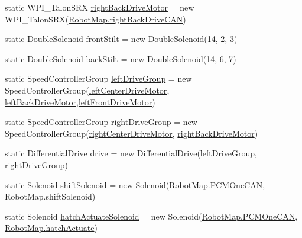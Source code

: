 \begin{DoxyCompactItemize}
\item 
static W\+P\+I\+\_\+\+Talon\+S\+RX \hyperlink{classfrc_1_1robot_1_1OI_a5f2937beffdc7dd1d937aaff36f20c1e}{right\+Back\+Drive\+Motor} = new W\+P\+I\+\_\+\+Talon\+S\+RX(\hyperlink{classfrc_1_1robot_1_1RobotMap_a0fb2fff6bf26e3f196d1cb02a89072c3}{Robot\+Map.\+right\+Back\+Drive\+C\+AN})
\item 
static Double\+Solenoid \hyperlink{classfrc_1_1robot_1_1OI_a4f6b2dd823bad92cfaf2e9ecc7c0b1ca}{front\+Stilt} = new Double\+Solenoid(14, 2, 3)
\item 
static Double\+Solenoid \hyperlink{classfrc_1_1robot_1_1OI_a89667abb08d7721a47088f0218fd5afa}{back\+Stilt} = new Double\+Solenoid(14, 6, 7)
\item 
static Speed\+Controller\+Group \hyperlink{classfrc_1_1robot_1_1OI_a6d76241e542ab271366e4cb4bf7b5133}{left\+Drive\+Group} = new Speed\+Controller\+Group(\hyperlink{classfrc_1_1robot_1_1OI_a8c33a9f0b9e366e48abd23ab01907e18}{left\+Center\+Drive\+Motor}, \hyperlink{classfrc_1_1robot_1_1OI_a88080d092baf8ece2c22f2ceec4f6f8f}{left\+Back\+Drive\+Motor},\hyperlink{classfrc_1_1robot_1_1OI_a3f39e281419ebd60b94126e87e3ec81d}{left\+Front\+Drive\+Motor})
\item 
static Speed\+Controller\+Group \hyperlink{classfrc_1_1robot_1_1OI_a1595c2b8ebd7e4e467027b2eb21983ee}{right\+Drive\+Group} = new Speed\+Controller\+Group(\hyperlink{classfrc_1_1robot_1_1OI_a9be3279c18d1f3433d6b07c706eb1457}{right\+Center\+Drive\+Motor}, \hyperlink{classfrc_1_1robot_1_1OI_a5f2937beffdc7dd1d937aaff36f20c1e}{right\+Back\+Drive\+Motor})
\item 
static Differential\+Drive \hyperlink{classfrc_1_1robot_1_1OI_a8527ec31aa37a3ff523e5ba857aba46f}{drive} = new Differential\+Drive(\hyperlink{classfrc_1_1robot_1_1OI_a6d76241e542ab271366e4cb4bf7b5133}{left\+Drive\+Group}, \hyperlink{classfrc_1_1robot_1_1OI_a1595c2b8ebd7e4e467027b2eb21983ee}{right\+Drive\+Group})
\item 
static Solenoid \hyperlink{classfrc_1_1robot_1_1OI_a63a56e8585378f6afe6f45facc98f494}{shift\+Solenoid} = new Solenoid(\hyperlink{classfrc_1_1robot_1_1RobotMap_a79a848df56d706c787d9a4f9a0434e7f}{Robot\+Map.\+P\+C\+M\+One\+C\+AN}, Robot\+Map.\+shift\+Solenoid)
\item 
static Solenoid \hyperlink{classfrc_1_1robot_1_1OI_a232ad4f80d75cd3d48c2067251c59817}{hatch\+Actuate\+Solenoid} = new Solenoid(\hyperlink{classfrc_1_1robot_1_1RobotMap_a79a848df56d706c787d9a4f9a0434e7f}{Robot\+Map.\+P\+C\+M\+One\+C\+AN}, \hyperlink{classfrc_1_1robot_1_1RobotMap_a7bec1963c7590911eb30697b0707d9b4}{Robot\+Map.\+hatch\+Actuate})

\end{DoxyCompactItemize}
